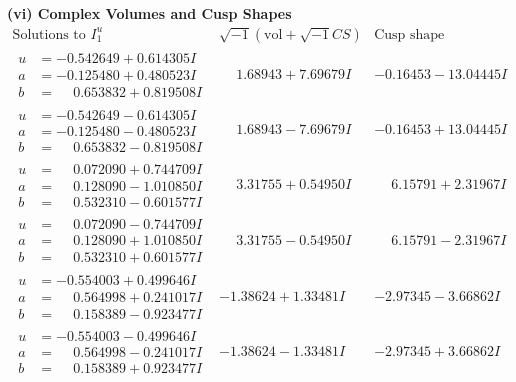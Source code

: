 \documentclass[1p]{elsarticle_modified}
\theoremstyle{definition}
\newcommand{\I}{\sqrt{-1}}
\begin{document}
\newpage\flushleft \textbf{(vi) Complex Volumes and Cusp Shapes}
$$\begin{array}{c|c|c}  
\text{Solutions to }I^u_{1}& \I (\text{vol} + \sqrt{-1}CS) & \text{Cusp shape}\\
 \hline 
\begin{aligned}
u &= -0.542649 + 0.614305 I \\
a &= -0.125480 + 0.480523 I \\
b &= \phantom{-}0.653832 + 0.819508 I\end{aligned}
 & \phantom{-}1.68943 + 7.69679 I & -0.16453 - 13.04445 I \\ \hline\begin{aligned}
u &= -0.542649 - 0.614305 I \\
a &= -0.125480 - 0.480523 I \\
b &= \phantom{-}0.653832 - 0.819508 I\end{aligned}
 & \phantom{-}1.68943 - 7.69679 I & -0.16453 + 13.04445 I \\ \hline\begin{aligned}
u &= \phantom{-}0.072090 + 0.744709 I \\
a &= \phantom{-}0.128090 - 1.010850 I \\
b &= \phantom{-}0.532310 - 0.601577 I\end{aligned}
 & \phantom{-}3.31755 + 0.54950 I & \phantom{-}6.15791 + 2.31967 I \\ \hline\begin{aligned}
u &= \phantom{-}0.072090 - 0.744709 I \\
a &= \phantom{-}0.128090 + 1.010850 I \\
b &= \phantom{-}0.532310 + 0.601577 I\end{aligned}
 & \phantom{-}3.31755 - 0.54950 I & \phantom{-}6.15791 - 2.31967 I \\ \hline\begin{aligned}
u &= -0.554003 + 0.499646 I \\
a &= \phantom{-}0.564998 + 0.241017 I \\
b &= \phantom{-}0.158389 - 0.923477 I\end{aligned}
 & -1.38624 + 1.33481 I & -2.97345 - 3.66862 I \\ \hline\begin{aligned}
u &= -0.554003 - 0.499646 I \\
a &= \phantom{-}0.564998 - 0.241017 I \\
b &= \phantom{-}0.158389 + 0.923477 I\end{aligned}
 & -1.38624 - 1.33481 I & -2.97345 + 3.66862 I \\ \hline\begin{aligned}

\end{aligned}
\end{array}$$
\end{document}
